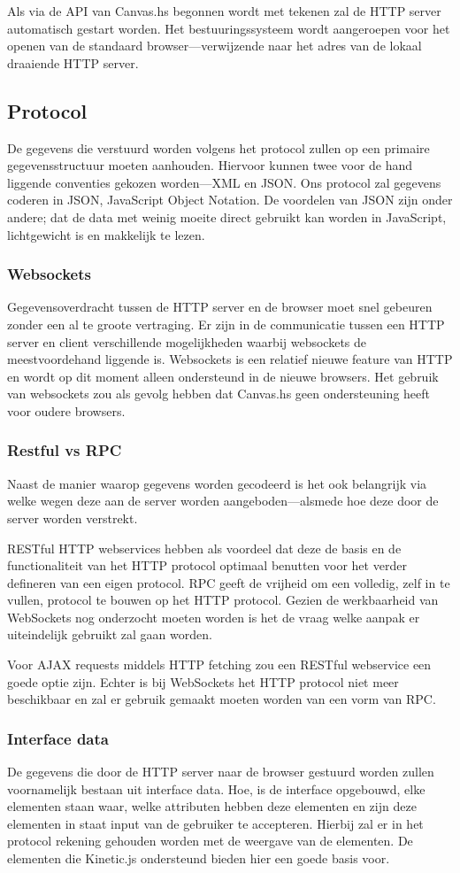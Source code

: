 \documentclass[a4paper]{report}
\begin{document}
Als via de API van Canvas.hs begonnen wordt met tekenen zal de HTTP server automatisch gestart worden. Het bestuuringssysteem wordt aangeroepen voor het openen van de standaard browser—verwijzende naar het adres van de lokaal draaiende HTTP server.
\subsection{Protocol}
De gegevens die verstuurd worden volgens het protocol zullen op een primaire gegevensstructuur moeten aanhouden. Hiervoor kunnen twee voor de hand liggende conventies gekozen worden—XML en JSON. Ons protocol zal gegevens coderen in JSON, JavaScript Object Notation. De voordelen van JSON zijn onder andere; dat de data met weinig moeite direct gebruikt kan worden in JavaScript, lichtgewicht is en makkelijk te lezen.
\subsubsection{Websockets}
Gegevensoverdracht tussen de HTTP server en de browser moet snel gebeuren zonder een al te groote vertraging. Er zijn in de communicatie tussen een HTTP server en client verschillende mogelijkheden waarbij websockets de meestvoordehand liggende is. Websockets is een relatief nieuwe feature van HTTP en wordt op dit moment alleen ondersteund in de nieuwe browsers. Het gebruik van websockets zou als gevolg hebben dat Canvas.hs geen ondersteuning heeft voor oudere browsers.
\subsubsection{Restful vs RPC}
Naast de manier waarop gegevens worden gecodeerd is het ook belangrijk via welke wegen deze aan de server worden aangeboden—alsmede hoe deze door de server worden verstrekt.

RESTful HTTP webservices hebben als voordeel dat deze de basis en de functionaliteit van het HTTP protocol optimaal benutten voor het verder defineren van een eigen protocol. RPC geeft de vrijheid om een volledig, zelf in te vullen, protocol te bouwen op het HTTP protocol. Gezien de werkbaarheid van WebSockets nog onderzocht moeten worden is het de vraag welke aanpak er uiteindelijk gebruikt zal gaan worden.

Voor AJAX requests middels HTTP fetching zou een RESTful webservice een goede optie zijn. Echter is bij WebSockets het HTTP protocol niet meer beschikbaar en zal er gebruik gemaakt moeten worden van een vorm van RPC. 
\subsubsection{Interface data}
De gegevens die door de HTTP server naar de browser gestuurd worden zullen voornamelijk bestaan uit interface data. Hoe, is de interface opgebouwd, elke elementen staan waar, welke attributen hebben deze elementen en zijn deze elementen in staat input van de gebruiker te accepteren. Hierbij zal er in het protocol rekening gehouden worden met de weergave van de elementen. De elementen die Kinetic.js ondersteund bieden hier een goede basis voor.
\end{document}
